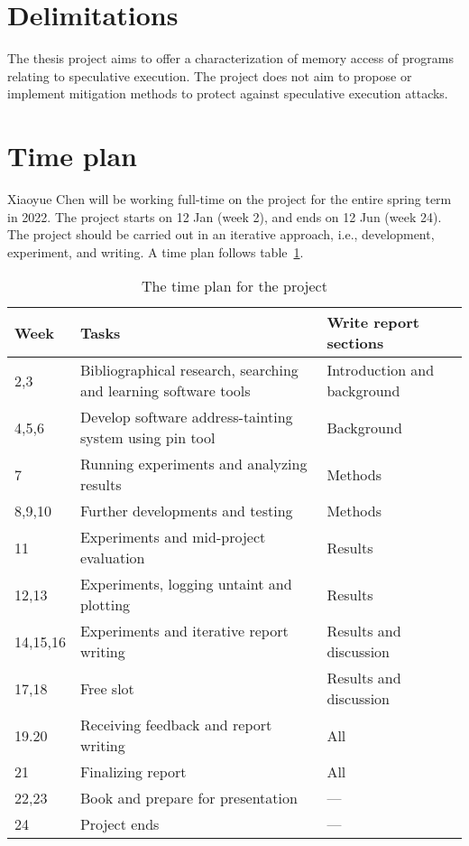 \documentclass[a4paper]{article}
\begin{document}
\section{Delimitations}
The thesis project aims to offer a characterization of memory access
of programs relating to speculative execution. The project does not
aim to propose or implement mitigation methods to protect against
speculative execution attacks.

\section{Time plan}
Xiaoyue Chen will be working full-time on the project for the entire
spring term in 2022. The project starts on 12 Jan (week 2), and ends
on 12 Jun (week 24). The project should be carried out in an iterative
approach, i.e., development, experiment, and writing. A time plan
follows table~\ref{tab:timeplan}.

\begin{landscape}
\begin{table}[h]
  \centering
  \begin{tabular}{lll}
    \toprule
    Week &  Tasks & Write report sections \\
    \midrule
    2,3 & Bibliographical research, searching and learning software tools & Introduction and background \\
    4,5,6 & Develop software address-tainting system using pin tool & Background \\
    7 & Running experiments and analyzing results & Methods \\
    8,9,10 & Further developments and testing & Methods \\
    11 & Experiments and mid-project evaluation & Results \\
    12,13 & Experiments, logging untaint and plotting & Results \\
    14,15,16 & Experiments and iterative report writing & Results and discussion \\
    17,18 & Free slot & Results and discussion \\
    19.20 & Receiving feedback and report writing & All \\
    21 & Finalizing report & All \\
    22,23 & Book and prepare for presentation & --- \\
    24 & Project ends & --- \\
    \bottomrule
  \end{tabular}
  \caption{The time plan for the project}
  \label{tab:timeplan}
\end{table}
\end{landscape}


 
\end{document}
